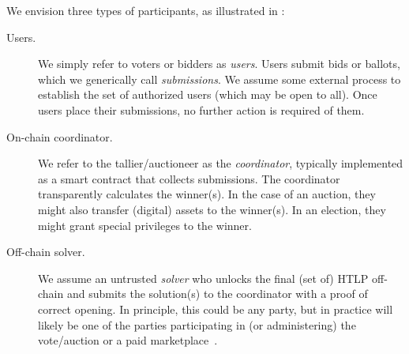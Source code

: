 


We envision three types of participants, as illustrated in :
\begin{description}
    \item[Users.] We simply refer to voters or bidders as \emph{users}. Users submit bids or ballots, which we generically call \emph{submissions}. We assume some external process to establish the set of authorized users (which may be open to all).  Once users place their submissions, no further action is required of them. 
    \item[On-chain coordinator.] We refer to the tallier/auctioneer as the \emph{coordinator}, typically implemented as a smart contract that collects submissions. The coordinator transparently calculates the winner(s). In the case of an auction, they might also transfer (digital) assets to the winner(s). In an election, they might grant special privileges to the winner.%
    \item[Off-chain solver.] We assume an untrusted \emph{solver} who unlocks the final (set of) HTLP off-chain and submits the solution(s) to the coordinator with a proof of correct opening. In principle, this could be any party, but in practice will likely be one of the parties participating in (or administering) the vote/auction or a paid marketplace~\cite{EPRINT:Abadi23,CCS:TGBKS21}.
\end{description}